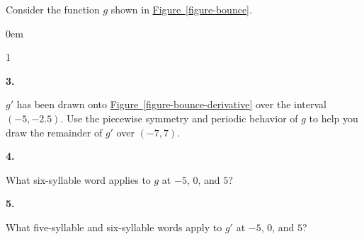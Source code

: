 \documentclass[12pt,]{book}
\theoremstyle{plain}
\theoremstyle{definition}
\numberwithin{equation}{section}
\newcounter{figstack}
\newcounter{figindex}
\newlength\fight
\newcommand\pushValignCaptionBottom[5][b]{%
\stepcounter{figstack}%
\expandafter\def\csname %
figalign\romannumeral\value{figstack}\endcsname{#1}%
\expandafter\def\csname %
figtype\romannumeral\value{figstack}\endcsname{#2}%
\expandafter\def\csname %
figwd\romannumeral\value{figstack}\endcsname{#3}%
\expandafter\def\csname %
figcontent\romannumeral\value{figstack}\endcsname{#4}%
\expandafter\def\csname %
figcap\romannumeral\value{figstack}\endcsname{#5}%
\setbox0=\hbox{%
\begin{#2}{#3}#4\end{#2}}%
\ifdim\dimexpr\ht0+\dp0\relax>\fight\global\setlength{\fight}{%
\dimexpr\ht0+\dp0\relax}\fi%
}
\newcommand\popValignCaptionBottom{%
\setcounter{figindex}{0}%
\hfill%
\whiledo{\value{figindex}<\value{figstack}}{%
\stepcounter{figindex}%
\def\tmp{\csname figwd\romannumeral\value{figindex}\endcsname}%
\begin{\csname figtype\romannumeral\value{figindex}\endcsname}[t]{\tmp}%
\centering%
\stackinset{c}{}%
{\csname figalign\romannumeral\value{figindex}\endcsname}{}%
{\csname figcontent\romannumeral\value{figindex}\endcsname}%
{\rule{0pt}{\fight}}\par%
\csname figcap\romannumeral\value{figindex}\endcsname%
\end{\csname figtype\romannumeral\value{figindex}\endcsname}%
\hfill%
}%
\setcounter{figstack}{0}%
\setlength{\fight}{0pt}%
\hfill%
}
\newenvironment{exercisegroup}%
{\medskip\noindent}%
{\par\bigskip}%
\newlength{\exercisegroupindent}%
\newlength{\exercisegroupitemwidth}%
\newenvironment{exercisegrouplist}%
{\vspace{-\partopsep}%
\begin{adjustwidth}{\exercisegroupindent}{0em}}%
{\end{adjustwidth}%
\vspace{-\partopsep}%
\vspace{\baselineskip}}%
\newenvironment{exercisegroupbycol}[1]%
{\begin{exercisegrouplist}%
\vspace{-\multicolsep}%
\begin{multicols}{#1}%
\setlength{\parindent}{0em}%
\setlength{\exercisegroupitemwidth}{\linewidth}}%
{\end{multicols}%
\vspace{-\multicolsep}%
\end{exercisegrouplist}}%
\newenvironment{exercisegroupitem}[1]%
{\begin{minipage}[t]{\exercisegroupitemwidth}
\vspace{0pt}%
{\bfseries#1}%
\rule{0pt}{\baselineskip}}{\strut%
\end{minipage}%
\hspace{\columnsep}}%
\providecommand\phantomsection{}
\newcommand{\fe}[2]{\mathop{{#1}{\left(#2\right)}}}
\newcommand{\ointerval}[2]{\left(#1,#2\right)}
\newcommand{\fd}[1]{#1'}
\begin{document}
\begin{exercisegroup}%
Consider the function \(g\) shown in \hyperref[figure-bounce]{Figure~\ref*{figure-bounce}}.%
\begin{exercisegroupbycol}{1}%
\begin{exercisegroupitem}{3. }\phantomsection\hypertarget{exercise-175}{\null}
\(\fd{g}\) has been drawn onto \hyperref[figure-bounce-derivative]{Figure~\ref*{figure-bounce-derivative}}  over the interval \(\ointerval{-5}{-2.5}\). Use the piecewise symmetry and periodic behavior of \(g\) to help you draw the remainder of \(\fd{g}\) over \(\ointerval{-7}{7}\).%
\end{exercisegroupitem}%
\par%
\begin{exercisegroupitem}{4. }\phantomsection\hypertarget{exercise-176}{\null}
What six-syllable word applies to \(g\) at \(-5\), \(0\), and \(5\)?%
\end{exercisegroupitem}%
\par%
\begin{exercisegroupitem}{5. }\phantomsection\hypertarget{exercise-177}{\null}
What five-syllable and six-syllable words apply to \(\fd{g}\) at \(-5\), \(0\), and \(5\)?%
\end{exercisegroupitem}%
\par%
\end{exercisegroupbycol}%
\end{exercisegroup}%
\typeout{************************************************}
\typeout{************************************************}
\end{document}
